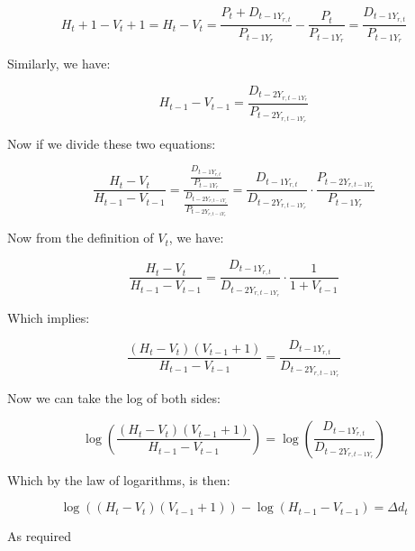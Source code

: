 \documentclass[11pt]{article}
\begin{document}
\[H_t + 1 - V_t + 1 = H_t - V_t = \frac{P_t + D_{t-1 Y_{r,t}}}{P_{t-1Y_r}} - \frac{P_t}{P_{t-1 Y_r}} = \frac{D_{t-1 Y_{r,t}}}{P_{t-1Y_r}}\]

\noindent Similarly, we have:

\[H_{t-1} - V_{t-1} = \frac{D_{t-2 Y_{r,t-1 Y_r}}}{P_{t-2 Y_{r,t-1 Y_r}}}\]

\noindent Now if we divide these two equations:

\[\frac{H_t - V_t}{H_{t-1} - V_{t-1}} = \frac{\frac{D_{t-1 Y_{r,t}}}{P_{t-1Y_r}}}{\frac{D_{t-2 Y_{r,t-1 Y_r}}}{P_{t-2 Y_{r,t-1 Y_r}}}} = \frac{D_{t-1 Y_{r,t}}}{D_{t-2 Y_{r,t-1 Y_r}}} \cdot \frac{P_{t-2 Y_{r,t-1 Y_r}}}{P_{t-1Y_r}}\]

\noindent Now from the definition of $V_t$, we have:

\[\frac{H_t - V_t}{H_{t-1} - V_{t-1}} = \frac{D_{t-1 Y_{r,t}}}{D_{t-2 Y_{r,t-1 Y_r}}} \cdot \frac{1}{1+V_{t-1}}  \]

\noindent Which implies: 

\[ \frac{(H_t - V_t)(V_{t - 1} + 1)}{H_{t-1} - V_{t-1}} = \frac{D_{t-1 Y_{r,t}}}{D_{t-2 Y_{r,t-1 Y_r}}}\]

\noindent Now we can take the log of both sides:

\[ \log \left(\frac{(H_t - V_t)(V_{t-1} + 1)}{H_{t-1} - V_{t-1}}\right) = \log \left( \frac{D_{t-1 Y_{r,t}}}{D_{t-2 Y_{r,t-1 Y_r}}}\right)\]

\noindent Which by the law of logarithms, is then:

\[ \log \left ( (H_t - V_t)(V_{t-1} + 1 ) \right) - \log \left ( H_{t-1} - V_{t-1} \right) = \Delta d_t\]

\noindent As required
\end{document}
